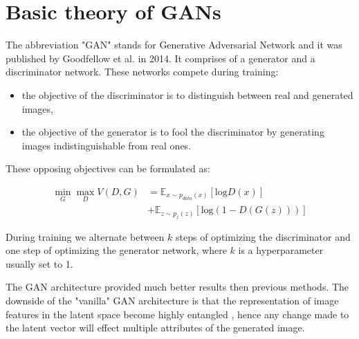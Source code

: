 \documentclass[10pt,journal,compsoc]{IEEEtran}
\begin{document}




\section{Basic theory of GANs}
The abbreviation "GAN" stands for Generative Adversarial Network and it was published by Goodfellow et al. \cite{goodfellow2014generative} in 2014. It comprises of a generator and a discriminator network. These networks compete during training:

\begin{itemize}
	\item the objective of the discriminator is to distinguish between real and generated images,
	\item the objective of the generator is to fool the discriminator by generating images indistinguishable from real ones. 
\end{itemize}

These opposing objectives can be formulated as:

\begin{equation}
\begin{aligned}
	\min_G \max_D V(D,G) &= \mathbb{E}_{x\sim p_{data}(x)}\left[ \mathrm{log}D(x) \right] \\
	&+ \mathbb{E}_{z\sim p_{z}(z)}\left[ \mathrm{log}(1-D(G(z)))\right]
\end{aligned}
\end{equation}

During training we alternate between $k$ steps of optimizing the discriminator and one step of optimizing the generator network, where $k$ is a hyperparameter usually set to 1.

The GAN architecture provided much better results then previous methods. The downside of the "vanilla" GAN architecture is that the representation of image features in the latent space become highly entangled \cite{radford2015unsupervised}, hence any change made to the latent vector will effect multiple attributes of the generated image.
\end{document}
